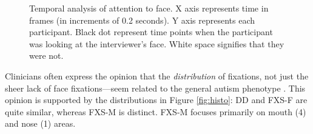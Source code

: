 \documentclass{llncs}
\begin{document}
 \begin{figure}[t]
     \hfill
     \hfill
     \centering
  \vspace{-1 em}
     \caption{Temporal analysis of attention to face. X axis represents time in frames (in increments of 0.2 seconds). Y axis represents each participant. Black dot represent time points when the participant was looking at the interviewer's face. White space signifies that they were not.}
    \label{fig:sticky}
    \vspace{-1 em}
   \end{figure}
   
Clinicians often express the opinion that the \emph{distribution} of fixations, not just the sheer lack of face fixations---seem related to the general autism phenotype \cite{klin2002,jones2013}. This opinion is supported by the distributions in Figure \ref{fig:histo}: DD and FXS-F are quite similar, whereas FXS-M is distinct. FXS-M focuses primarily on mouth (4) and nose (1) areas.
  
\end{document}

